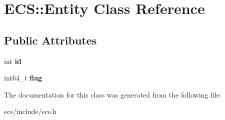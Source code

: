 \hypertarget{class_e_c_s_1_1_entity}{\section{E\-C\-S\-:\-:Entity Class Reference}
\label{class_e_c_s_1_1_entity}
}
\subsection*{Public Attributes}
\begin{DoxyCompactItemize}
\item 
\hypertarget{class_e_c_s_1_1_entity_a96a315e99204b7be2324c4b95be15a82}{int {\bfseries id}}\label{class_e_c_s_1_1_entity_a96a315e99204b7be2324c4b95be15a82}

\item 
\hypertarget{class_e_c_s_1_1_entity_a5a3b15e6be91b1d7e5f066227db22d5c}{int64\-\_\-t {\bfseries flag}}\label{class_e_c_s_1_1_entity_a5a3b15e6be91b1d7e5f066227db22d5c}

\end{DoxyCompactItemize}


The documentation for this class was generated from the following file\-:\begin{DoxyCompactItemize}
\item 
ecs/include/ecs.\-h\end{DoxyCompactItemize}
